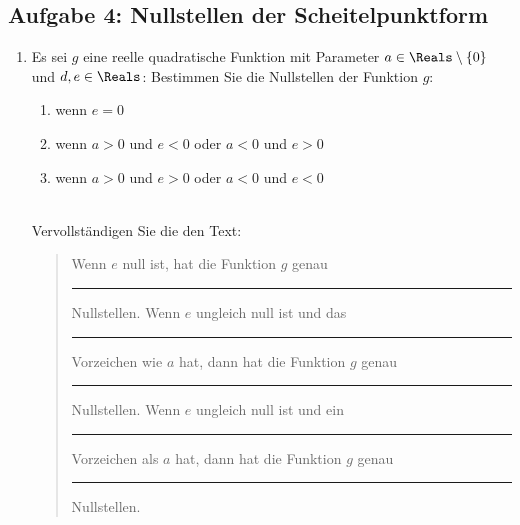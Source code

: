 \documentclass[12pt]{article}
\begin{document}
\subsection*{Aufgabe 4: Nullstellen der Scheitelpunktform}
\begin{enumerate}[label=\alph*)]
%

\item Es sei $g$ eine reelle quadratische Funktion mit Parameter $a \in \Reals\setminus\{0\}$ und $d,e \in \Reals$: 
Bestimmen Sie die Nullstellen der Funktion $g$: \begin{enumerate}[label=\roman*)]
\item wenn $e=0$
\item wenn $a>0$ und $e<0$ oder $a<0$ und $e>0$
\item wenn $a>0$ und $e>0$ oder $a<0$ und $e<0$
\end{enumerate}\hfill\\
Vervollständigen Sie die den Text:
\begin{quotation}
\begin{spacing}{2}
Wenn $e$ null ist, hat die Funktion $g$ genau \rule{0.5cm}{0.5pt} Nullstellen. Wenn $e$ ungleich null ist und das \rule{2cm}{0.5pt}  Vorzeichen wie $a$ hat, dann hat die Funktion $g$ genau \rule{0.5cm}{0.5pt} Nullstellen. Wenn $e$ ungleich null ist und ein \rule{2cm}{0.5pt}  Vorzeichen als $a$ hat, dann hat die Funktion $g$ genau \rule{0.5cm}{0.5pt} Nullstellen.
\end{spacing}
\end{quotation}
\begin{solution}


\end{solution}
\end{enumerate}
\end{document}
